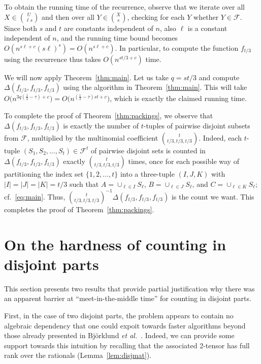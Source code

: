 \documentclass{amsart}
\begin{document}
To obtain the running time of the recurrence, observe that we
iterate over all $X\in\binom{U}{\ell s}$ and then over all
$Y\in\binom{X}{s}$, checking for each $Y$ whether $Y\in\mathcal{F}$.
Since both $s$ and $t$ are constants independent of $n$, 
also $\ell$ is a constant independent of $n$, and the running 
time bound becomes $O(n^{s\ell+c}(s\ell)^s)=O(n^{s\ell+c})$.
In particular, to compute the function $f_{t/3}$ using the recurrence 
thus takes $O(n^{st/3+c})$ time.

We will now apply Theorem~\ref{thm:main}. Let us take
$q=st/3$ and compute $\Delta(f_{t/3},f_{t/3},f_{t/3})$ using
the algorithm in Theorem~\ref{thm:main}. This will take
$O\bigl(n^{3q(\frac{1}{2}-\tau)+c}\bigl)=
O\bigl(n^{(\frac{1}{2}-\tau)st+c}\bigl)$, which is exactly
the claimed running time. 

To complete the proof of Theorem~\ref{thm:packings}, we observe 
that $\Delta(f_{t/3},f_{t/3},f_{t/3})$
is exactly the number of $t$-tuples of pairwise disjoint subsets
from $\mathcal{F}$, multiplied by the multinomial coefficient
$\binom{t}{t/3,t/3,t/3}$. Indeed, each $t$-tuple 
$(S_1,S_2,\ldots,S_t)\in\mathcal{F}^t$ of pairwise disjoint sets 
is counted in $\Delta(f_{t/3},f_{t/3},f_{t/3})$ exactly 
$\binom{t}{t/3,t/3,t/3}$ times, once for each possible way of 
partitioning the index set $\{1,2,\ldots,t\}$ into a three-tuple 
$(I,J,K)$ with $|I|=|J|=|K|=t/3$ such that 
$A=\cup_{\ell\in I}S_\ell$, $B=\cup_{\ell\in J}S_\ell$, 
and $C=\cup_{\ell\in K}S_\ell$; cf.~\eqref{eq:main}. 
Thus, $\binom{t}{t/3,t/3,t/3}^{-1}\Delta(f_{t/3},f_{t/3},f_{t/3})$
is the count we want. This completes the proof of Theorem~\ref{thm:packings}.

\section{On the hardness of counting in disjoint parts}
\label{sect:lower-bounds}

This section presents two results that provide partial
justification why there was an apparent barrier 
at ``meet-in-the-middle time'' for counting in disjoint parts. 

First, in the case of two disjoint parts, the problem appears to
contain no algebraic dependency that one could expoit towards
faster algorithms beyond those already presented in 
Bj\"orklund {\em et al.}~\cite{BHKK08,BHKK09}. Indeed, we can
provide some support towards this intuition by recalling that
the associated 2-tensor has full rank over the rationals
(Lemma~\ref{lem:disjmat}).
\end{document}
